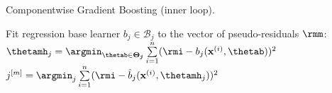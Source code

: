 \begin{algorithm}[H]
  \begin{footnotesize}
  \begin{center}
  \caption{Componentwise Gradient Boosting (inner loop).}
    \begin{algorithmic}[1]
        \setcounter{ALG@line}{3}

          \State Fit regression base learner $b_j \in \mathcal{B}_j$ to the vector of pseudo-residuals $\rmm$:
          \State $\thetamh_j = \argmin_{\thetab \in \bm{\Theta_j}} \sum  \limits_{i=1}^n
          (\rmi - b_j(\xi, \thetab))^2$
        \EndFor
        \State $j^{[m]} = \argmin_{j} \sum  \limits_{i=1}^n (\rmi - \hat{b}_j(\xi, \thetamh_j))^2$

    \end{algorithmic}
    \end{center}
    \end{footnotesize}
    \color{black}
\end{algorithm}